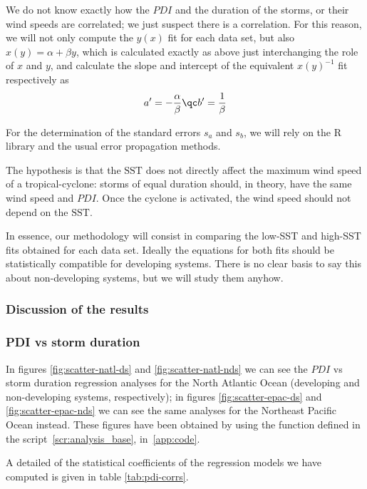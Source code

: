 We do not know exactly how the $PDI$ and the duration of the storms, or their wind speeds are correlated; we just suspect there is a correlation. For this reason, we will not only compute the $y(x)$ fit for each data set, but also $x(y) = \alpha + \beta y$, which is calculated exactly as above just interchanging the role of $x$ and $y$, and calculate the slope and intercept of the equivalent $x(y)^{-1}$ fit respectively as
\begin{align}
	a' = -\frac{\alpha}{\beta} \qc b' = \frac{1}{\beta}
\end{align}

For the determination of the standard errors $s_{a}$ and $s_{b}$, we will rely on the R  library and the usual error propagation methods.

\bigskip
The hypothesis is that the $\text{SST}$ does not directly affect the maximum wind speed of a tropical-cyclone: storms of equal duration should, in theory, have the same wind speed and $PDI$. Once the cyclone is activated, the wind speed should not depend on the $\text{SST}$.

In essence, our methodology will consist in comparing the low-SST and high-SST fits obtained for each data set. Ideally the equations for both fits should be statistically compatible for developing systems. There is no clear basis to say this about non-developing systems, but we will study them anyhow.

\subsubsection{Discussion of the results}\label{ssec:pdi-corr-res}
\subsubsection*{PDI vs storm duration}
In figures \ref{fig:scatter-natl-ds} and \ref{fig:scatter-natl-nds} we can see the $PDI$ vs storm duration regression analyses for the North Atlantic Ocean (developing and non-developing systems, respectively); in figures \ref{fig:scatter-epac-ds} and \ref{fig:scatter-epac-nds} we can see the same analyses for the Northeast Pacific Ocean instead. These figures have been obtained by using the  function defined in the script~\ref{scr:analysis_base}, in~\cref{app:code}.

A detailed of the statistical coefficients of the regression models we have computed is given in table \ref{tab:pdi-corrs}.

